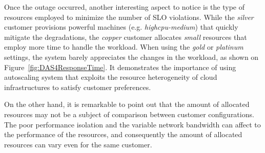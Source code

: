 Once the outage occurred, another interesting aspect to notice is the type of resources employed to minimize the number of SLO violations. While the \emph{silver} customer provisions powerful machines (e.g. \emph{highcpu-medium}) that quickly mitigate the degradations, the \emph{copper} customer allocates \emph{small} resources that employ more time to handle the workload. When using the \emph{gold} or \emph{platinum} settings, the system barely appreciates the changes in the workload, as shown on Figure~\ref{fig:DAS4ResponseTime}. It demonstrates the importance of using autoscaling system that exploits the resource heterogeneity of cloud infrastructures to satisfy customer preferences.


On the other hand, it is remarkable to point out that the amount of allocated resources may not be a subject of comparison between customer configurations. The poor performance isolation and the variable network bandwidth can affect to the performance of the resources, and consequently the amount of allocated resources can vary even for the same customer.





